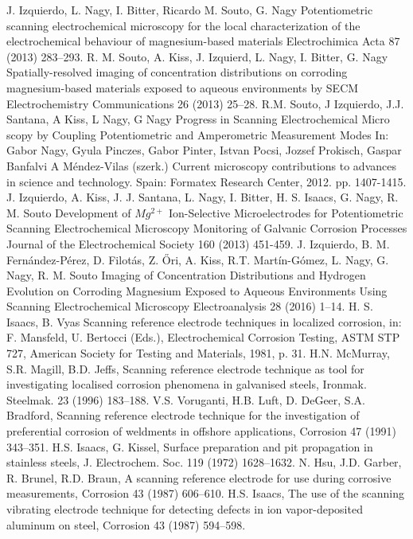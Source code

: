 \documentclass[3p]{elsarticle}
\begin{document}
\begin{thebibliography}{5}
J. Izquierdo, L. Nagy, I. Bitter, Ricardo M. Souto, G. Nagy 
Potentiometric scanning electrochemical microscopy for the local characterization of the electrochemical behaviour of magnesium-based materials Electrochimica Acta 87 (2013) 283–293.
R. M. Souto, A. Kiss, J. Izquierd, L. Nagy, I. Bitter, G. Nagy Spatially-resolved imaging of concentration distributions on corroding magnesium-based materials exposed to aqueous environments by SECM Electrochemistry Communications 26 (2013) 25–28.
R.M. Souto, J Izquierdo, J.J. Santana, A Kiss, L Nagy, G Nagy 
Progress in Scanning Electrochemical Micro scopy by Coupling Potentiometric and Amperometric Measurement Modes
In: Gabor Nagy, Gyula Pinczes, Gabor Pinter, Istvan Pocsi, Jozsef Prokisch, Gaspar Banfalvi
A Méndez-Vilas (szerk.)
Current microscopy contributions to advances in science and technology. Spain: Formatex Research Center, 2012. pp. 1407-1415.
J. Izquierdo, A. Kiss, J. J. Santana, L. Nagy, I. Bitter, H. S. Isaacs, G. Nagy, R. M. Souto
Development of $Mg^{2+}$ Ion-Selective Microelectrodes for Potentiometric Scanning Electrochemical Microscopy Monitoring of Galvanic Corrosion Processes
Journal of the Electrochemical Society  160 (2013) 451-459. 
J. Izquierdo, B. M. Fernández-Pérez, D. Filotás, Z. Őri, A. Kiss, R.T. Martín-Gómez, L. Nagy, G. Nagy, R. M. Souto Imaging of Concentration Distributions and Hydrogen Evolution on Corroding Magnesium Exposed to Aqueous Environments Using Scanning Electrochemical Microscopy Electroanalysis 28 (2016) 1–14.
H. S. Isaacs, B. Vyas Scanning reference electrode techniques in localized corrosion, in: F. Mansfeld, U. Bertocci (Eds.), Electrochemical Corrosion Testing, ASTM STP 727, American Society for Testing and Materials, 1981, p. 31.
H.N. McMurray, S.R. Magill, B.D. Jeffs, Scanning reference electrode technique as tool for investigating localised corrosion phenomena in galvanised steels, Ironmak. Steelmak. 23 (1996) 183–188.
V.S. Voruganti, H.B. Luft, D. DeGeer, S.A. Bradford, Scanning reference electrode technique for the investigation of preferential corrosion of weldments in offshore applications, Corrosion 47 (1991) 343–351.
H.S. Isaacs, G. Kissel, Surface preparation and pit propagation in stainless steels, J. Electrochem. Soc. 119 (1972) 1628–1632.
N. Hsu, J.D. Garber, R. Brunel, R.D. Braun, A scanning reference electrode for use during corrosive measurements, Corrosion 43 (1987) 606–610.
H.S. Isaacs, The use of the scanning vibrating electrode technique for detecting defects in ion vapor-deposited aluminum on steel, Corrosion 43 (1987) 594–598.   


\end{thebibliography}
\end{document}
